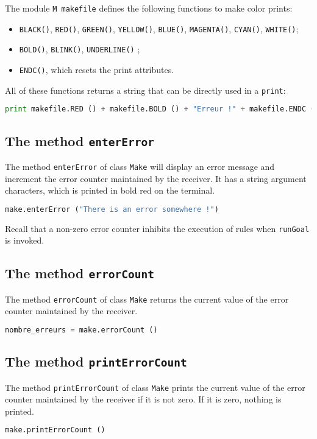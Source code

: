 \documentclass[a4paper,11pt]{extarticle}
\begin{document}
The module \texttt{M
makefile} defines the following functions to make color prints:
\begin{itemize}
  \item \texttt{BLACK()}, \texttt{RED()}, \texttt{GREEN()}, \texttt{YELLOW()}, \texttt{BLUE()}, \texttt{MAGENTA()}, \texttt{CYAN()}, \texttt{WHITE()};
  \item \texttt{BOLD()}, \texttt{BLINK()}, \texttt{UNDERLINE()} ;
  \item \texttt{ENDC()}, which resets the print attributes.
\end{itemize}
All of these functions returns a string that can be directly used in a \texttt{print}:
\begin{lstlisting}[language=py]
print makefile.RED () + makefile.BOLD () + "Erreur !" + makefile.ENDC ()
\end{lstlisting}


\subsection{The method \texttt{enterError}}

The method \texttt{enterError} of class \texttt{Make} will display an error message and increment the error counter maintained by the receiver. It has a string argument characters, which is printed in bold red on the terminal.
\begin{lstlisting}[language=py]
make.enterError ("There is an error somewhere !")
\end{lstlisting}
Recall that a non-zero error counter inhibits the execution of rules when \texttt{runGoal}  is invoked.

\subsection{The method \texttt{errorCount}}

The method \texttt{errorCount} of class \texttt{Make} returns the current value of the error counter maintained by the receiver.
\begin{lstlisting}[language=py]
nombre_erreurs = make.errorCount ()
\end{lstlisting}


\subsection{The method \texttt{printErrorCount}}

The method \texttt{printErrorCount}  of class \texttt{Make} prints the current value of the error counter maintained by the receiver if it is not zero. If it is zero, nothing is printed.
\begin{lstlisting}[language=py]
make.printErrorCount ()
\end{lstlisting}
\end{document}
